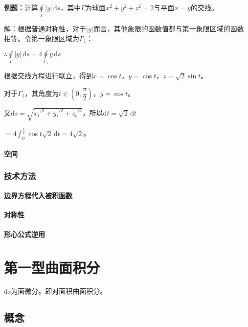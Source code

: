 \documentclass[UTF8, 12pt]{ctexart}
\begin{document}
        \textbf{例题：}计算$\oint\limits_\Gamma\vert y\vert\,\textrm{d}s$，其中$\Gamma$为球面$x^2+y^2+z^2=2$与平面$x=y$的交线。

        解：根据普通对称性，对于$\vert y\vert$而言，其他象限的函数值都与第一象限区域的函数相等。令第一象限区域为$\Gamma_1$：

        $\therefore\oint\limits_\Gamma\vert y\vert\,\textrm{d}s=4\oint\limits_{\Gamma_1}y\,\textrm{d}s$

        根据交线方程进行联立，得到$x=\cos t$，$y=\cos t$，$z=\sqrt{2}\sin t$。

        对于$\Gamma_1$，其角度为$t\in\left(0,\dfrac{\pi}{2}\right)$，$y=\cos t$。

        又$\textrm{d}s=\sqrt{x_t'^2+y_t'^2+z_t'^2}$，所以$\textrm{d}t=\sqrt{2}\,\textrm{d}t$

        $=4\int_0^\frac{\pi}{2}\cos t\sqrt{2}\,\textrm{d}t=4\sqrt{2}$。

        \paragraph{空间} \leavevmode \medskip

        \subsubsection{技术方法}

        \paragraph{边界方程代入被积函数} \leavevmode \medskip

        \paragraph{对称性} \leavevmode \medskip

        \paragraph{形心公式逆用} \leavevmode \medskip

        \section{第一型曲面积分}

        $\textrm{d}s$为面微分。即对面积曲面积分。

        \subsection{概念}
\end{document}
